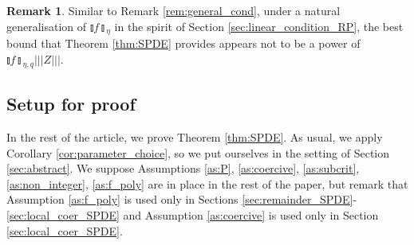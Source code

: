 \documentclass[11pt,a4paper]{article}
\numberwithin{equation}{section}
\theoremstyle{definition}
\newtheorem{remark}[theorem]{Remark}
\theoremstyle{remark}
\def\R{{\mathbb R}}
\newcommand{\disc}[1]{{\talloblong #1 \talloblong}}
\newcommand{\bphi}{\boldsymbol{\phi}}
\newcommand{\bk}{\mathbf{k}}
\newcommand{\s}{\mathfrak{s}}
\newcommand{\trinorm}[1]{{|\!|\!| #1 |\!|\!|}}
\begin{document}
\begin{remark}
Similar to Remark \ref{rem:general_cond},
under a natural generalisation of $\disc{f}_{\eta}$ in the spirit of Section \ref{sec:linear_condition_RP},
the best bound that Theorem \ref{thm:SPDE} provides appears not to be a power of $\disc{f}_{\eta,q}\trinorm{Z}$.
\end{remark}

\subsection{Setup for proof}
\label{sec:setup_SPDE}

In the rest of the article, we prove Theorem \ref{thm:SPDE}.
As usual, we apply  Corollary \ref{cor:parameter_choice}, so we put ourselves in the setting of Section \ref{sec:abstract}.
We suppose
Assumptions \ref{as:P}, \ref{as:coercive}, \ref{as:subcrit}, \ref{as:non_integer}, \ref{as:f_poly} are in place in the rest of the paper, but remark that Assumption \ref{as:f_poly} is used only in Sections \ref{sec:remainder_SPDE}-\ref{sec:local_coer_SPDE}
and Assumption \ref{as:coercive} is used only in Section \ref{sec:local_coer_SPDE}.
\end{document}
